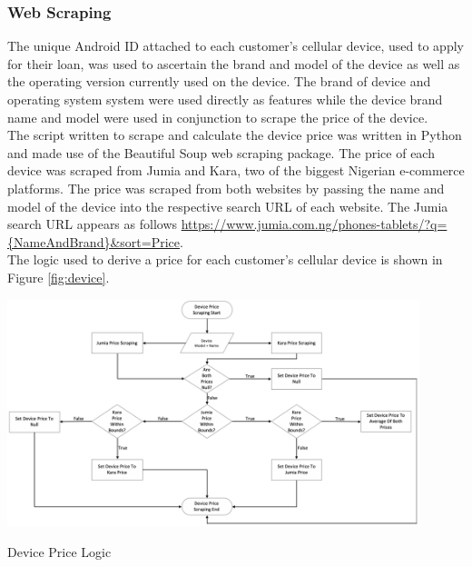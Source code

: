 \subsubsection{Web Scraping}

The unique Android ID attached to each customer's cellular device, used to apply for their loan, was used to ascertain the brand and model of the device as well as the operating version currently used on the device. The brand of device and operating system system were used directly as features while the device brand name and model were used in conjunction to scrape the price of the device. \\

The script written to scrape and calculate the device price was written in Python and made use of the Beautiful Soup web scraping package. The price of each device was scraped from Jumia and Kara, two of the biggest Nigerian e-commerce platforms. The price was scraped from both websites by passing the name and model of the device into the respective search URL of each website. The Jumia search URL appears as follows \url{https://www.jumia.com.ng/phones-tablets/?q={NameAndBrand}&sort=Price}. \\

The logic used to derive a price for each customer's cellular device is shown in Figure \ref{fig:device}.

\vspace{15pt}

\begin{Figure}[!htb]
\centering
\includegraphics[width=0.9\textwidth]{images/device_price.png}
\caption{Device Price Logic}
\label{fig:device}
\end{Figure}

\vspace{15pt}




